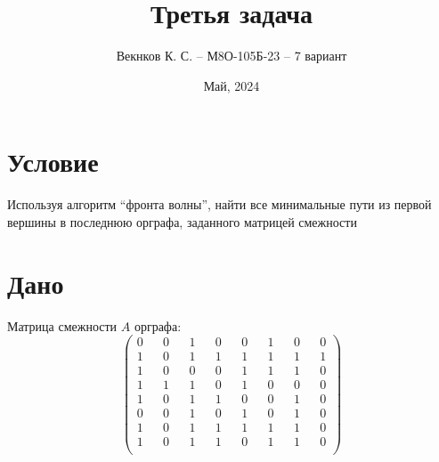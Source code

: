 \documentclass{article}
\title{Третья задача}
\author{Векнков К. С. -- М8О-105Б-23 -- 7 вариант}
\date{Май, 2024}
\begin{document}
\setcounter{page}{6}
\maketitle
\section*{Условие}
Используя алгоритм “фронта волны”, найти все минимальные пути из первой вершины в
последнюю орграфа, заданного матрицей смежности
\section*{Дано}
Матрица смежности $A$ орграфа:
$$
\begin{pmatrix}
    0 && 0 && 1 && 0 && 0 && 1 && 0 && 0\\ %
    1 && 0 && 1 && 1 && 1 && 1 && 1 && 1\\ %
    1 && 0 && 0 && 0 && 1 && 1 && 1 && 0\\ %
    1 && 1 && 1 && 0 && 1 && 0 && 0 && 0\\ %
    1 && 0 && 1 && 1 && 0 && 0 && 1 && 0\\ %
    0 && 0 && 1 && 0 && 1 && 0 && 1 && 0\\ %
    1 && 0 && 1 && 1 && 1 && 1 && 1 && 0\\ %
    1 && 0 && 1 && 1 && 0 && 1 && 1 && 0\\ %

\end{pmatrix}
$$
\end{document}
